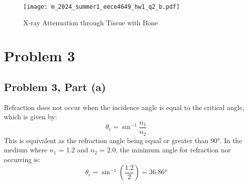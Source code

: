 \documentclass[12pt]{article}
\begin{document}
\begin{figure}[H] %
    \centering
    \texttt{[image: m\_2024\_summer1\_eece4649\_hw1\_q2\_b.pdf]}
    \caption{X-ray Attenuation through Tissue with Bone}
    \label{fig:attenuation}
\end{figure}


\newpage
\section*{Problem 3}
\subsection*{Problem 3, Part (a)}
Refraction does not occur when the incidence angle is equal to the critical angle, which is given by:
\[
\theta_c = \sin^{-1}{\frac{n_1}{n_2}}
\]
This is equivalent as the refraction angle being equal or greater than 90°. In the medium where $n_1$ = 1.2 and $n_2$ = 2.0, the minimum angle for refraction nor occurring is:
\[
\theta_c = \sin^{-1}{(\frac{1.2}{2})} = 36.86\text{°}
\]
\end{document}
